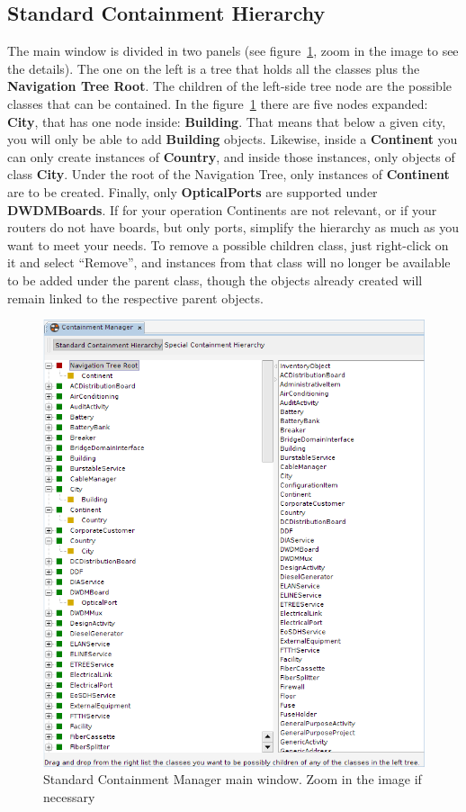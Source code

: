 \documentclass[a4paper]{article}
\begin{document}
	\subsection{Standard Containment Hierarchy} \label{sec:standard_containment_hierarchy}
	The main window is divided in two panels (see figure~\ref{fig:standard_containment_manager}, zoom in the image to see the details). The one on the left is a tree that holds all the classes plus the \textbf{Navigation Tree Root}. The children of the left-side tree node are the possible classes that can be contained. In the figure~\ref{fig:standard_containment_manager} there are five nodes expanded: \textbf{City}, that has one node inside: \textbf{Building}. That means that below a given city, you will only be able to add \textbf{Building} objects. Likewise, inside a \textbf{Continent} you can only create instances of \textbf{Country}, and inside those instances, only objects of class \textbf{City}. Under the root of the Navigation Tree, only instances of \textbf{Continent} are to be created. Finally, only \textbf{OpticalPorts} are supported under \textbf{DWDMBoards}. If for your operation Continents are not relevant, or if your routers do not have boards, but only ports, simplify the hierarchy as much as you want to meet your needs. To remove a possible children class, just right-click on it and select “Remove”, and instances from that class will no longer be available to be added under the parent class, though the objects already created will remain linked to the respective parent objects.
	
	\begin{figure}[h!]
		\centering
		\includegraphics[width=0.7\linewidth]{img/standard_containment_manager.png}
		\caption{Standard Containment Manager main window. Zoom in the image if necessary}
		\label{fig:standard_containment_manager}
	\end{figure}
	
\end{document}
